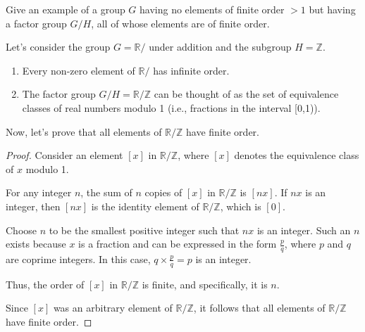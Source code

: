 \documentclass[12pt]{amsart}
\theoremstyle{definition}
\numberwithin{equation}{section}
\theoremstyle{plain}
\newcommand{\Z}{\mathbb{Z}}
\newcommand{\R}{\mathbb{R}}
\begin{document}
\begin{exercise}{28} Give an example of a group $G$ having no elements of finite order $> 1$ but having a factor group $G/H$, all of whose elements are of finite order.

    Let's consider the group \( G = \R/\) under addition and the subgroup \( H = \Z\). 
    
    \begin{enumerate}
        \item Every non-zero element of \( \R/\) has infinite order.
        \item The factor group \( G/H = \R/\Z\) can be thought of as the set of equivalence classes of real numbers modulo 1 (i.e., fractions in the interval [0,1)). 
    \end{enumerate}
    
    Now, let's prove that all elements of \( \R/\Z\) have finite order.
    
    \begin{proof}
    Consider an element \( [x] \) in \( \R/\Z\), where \( [x] \) denotes the equivalence class of \( x \) modulo 1. 
    
    For any integer \( n \), the sum of \( n \) copies of \( [x] \) in \( \R/\Z\) is \( [nx] \). If \( nx \) is an integer, then \( [nx] \) is the identity element of \( \R/\Z\), which is \( [0] \). 
    
    Choose \( n \) to be the smallest positive integer such that \( nx \) is an integer. Such an \( n \) exists because \( x \) is a fraction and can be expressed in the form \( \frac{p}{q} \), where \( p \) and \( q \) are coprime integers. In this case, \( q \times \frac{p}{q} = p \) is an integer.
    
    Thus, the order of \( [x] \) in \( \R/\Z\) is finite, and specifically, it is \( n \).
    
    Since \( [x] \) was an arbitrary element of \( \R/\Z\), it follows that all elements of \( \R/\Z\) have finite order.
    \end{proof}
    \end{exercise}
\vspace*{20pt}
\end{document}
